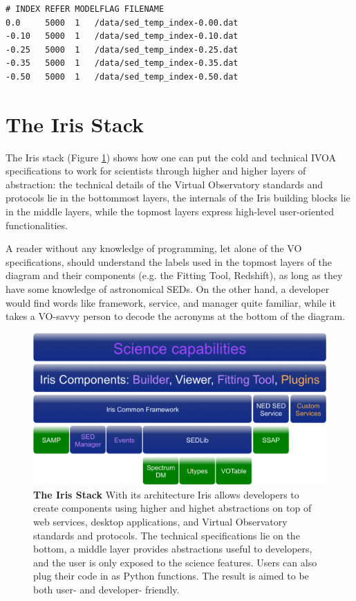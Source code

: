 \documentclass[5p]{elsarticle}
\begin{document}
\begin{lstlisting}[style=code,
	caption=Example of template library definition file,
	label=lst:templateconfig]
# INDEX REFER MODELFLAG FILENAME
0.0     5000  1   /data/sed_temp_index-0.00.dat
-0.10   5000  1   /data/sed_temp_index-0.10.dat
-0.25   5000  1   /data/sed_temp_index-0.25.dat
-0.35   5000  1   /data/sed_temp_index-0.35.dat
-0.50   5000  1   /data/sed_temp_index-0.50.dat
\end{lstlisting}


\section{The Iris Stack}
\label{sec:stack}

The Iris stack (Figure \ref{fig:stack}) shows how one can put the cold and technical IVOA specifications to work for scientists through higher and higher layers of abstraction: the technical details of the Virtual Observatory standards and protocols lie in the bottommost layers, the internals of the Iris building blocks lie in the middle layers, while the topmost layers express high-level user-oriented functionalities.

A reader without any knowledge of programming, let alone of the VO specifications, should understand the labels used in the topmost layers of the diagram and their components (e.g. the Fitting Tool, Redshift), as long as they have some knowledge of astronomical SEDs. On the other hand, a developer would find words like framework, service, and manager quite familiar, while it takes a VO-savvy person to decode the acronyms at the bottom of the diagram.

\begin{figure}
\label{fig:stack}
\begin{center}
\includegraphics[width=\columnwidth]{figures/IrisStack.png}
\caption{\textbf{The Iris Stack} With its architecture Iris allows developers to create components using higher and highet abstractions on top of web services, desktop applications, and Virtual Observatory standards and protocols. The technical specifications lie on the bottom, a middle layer provides abstractions useful to developers, and the user is only exposed to the science features. Users can also plug their code in as Python functions. The result is aimed to be both user- and developer- friendly.}
\end{center}
\end{figure}
\end{document}
